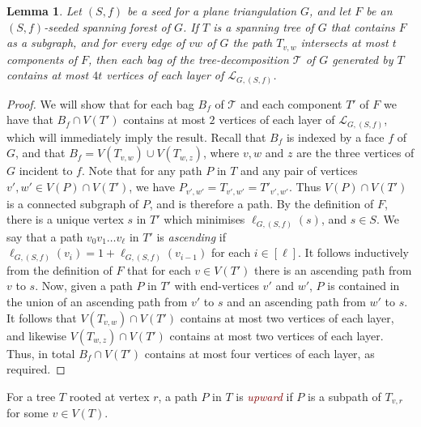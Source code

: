 \documentclass[11pt]{article}
\newcommand{\defn}[1]{\textcolor{Maroon}{\emph{#1}}}
\newcommand{\TT}{\mathcal{T}}
\theoremstyle{plain}
\newtheorem{lem}[thm]{Lemma}
\theoremstyle{definition}
\begin{document}
		\begin{lem}
			\label{GenerateTreeDecomp}
			Let $(S,f)$ be a seed for a plane triangulation $G$, and let $F$ be an $(S,f)$-seeded spanning forest of $G$.
			If $T$ is a spanning tree of $G$ that contains $F$ as a subgraph, and for every edge of $vw$ of $G$ the path $T_{v,w}$ intersects at most $t$ components of $F$, then each bag of the tree-decomposition $\TT$ of $G$ generated by $T$ contains at most $4t$ vertices of each layer of $\mathcal{L}_{G,(S,f)}$.
		\end{lem}
		\begin{proof}
			We will show that for each bag $B_f$ of $\TT$ and each component $T'$ of $F$ we have that $B_f\cap V(T')$ contains at most $2$ vertices of each layer of $\mathcal{L}_{G,(S,f)}$, which will immediately imply the result.
			Recall that $B_f$ is indexed by a face $f$ of $G$, and that $B_f=V(T_{v,w})\cup V(T_{w,z})$, where $v,w$ and $z$ are the three vertices of $G$ incident to $f$. 
			Note that for any path $P$ in $T$ and any pair of vertices $v',w'\in V(P)\cap V(T')$, we have $P_{v',w'}=T_{v',w'}=T'_{v',w'}$.
			Thus $V(P)\cap V(T')$ is a connected subgraph of $P$, and is therefore a path.
			By the definition of $F$, there is a unique vertex $s$ in $T'$ which minimises $\ell_{G,(S,f)}(s)$, and $s\in S$.
			We say that a path $v_0v_1\dots v_\ell$ in $T'$ is \emph{ascending} if $\ell_{G,(S,f)}(v_i)=1+\ell_{G,(S,f)}(v_{i-1})$ for each $i\in [\ell]$.
			It follows inductively from the definition of $F$ that for each $v\in V(T')$ there is an ascending path from $v$ to $s$. 
			Now, given a path $P$ in $T'$ with end-vertices $v'$ and $w'$, $P$ is contained in the union of an ascending path from $v'$ to $s$ and an ascending path from $w'$ to $s$.
			It follows that $V(T_{v,w})\cap V(T')$ contains at most two vertices of each layer, and likewise $V(T_{w,z})\cap V(T')$ contains at most two vertices of each layer.
			Thus, in total $B_f\cap V(T')$ contains at most four vertices of each layer, as required.
		\end{proof}
		
		For a tree $T$ rooted at vertex $r$, a path $P$ in $T$ is  \defn{upward} if $P$ is a subpath of $T_{v,r}$ for some $v\in V(T)$.
		
\end{document}
